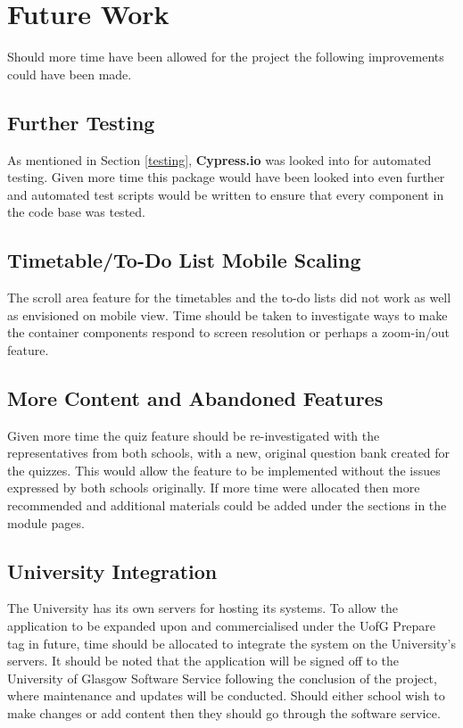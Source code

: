 \documentclass{l4proj}
\begin{document}
\section{Future Work}
Should more time have been allowed for the project the following improvements could have been made.

\subsection{Further Testing}
As mentioned in Section \ref{testing},  \textbf{Cypress.io} was looked into for automated testing. Given more time this package would have been looked into even further and automated test scripts would be written to ensure that every component in the code base was tested.

\subsection{Timetable/To-Do List Mobile Scaling}
The scroll area feature for the timetables and the to-do lists did not work as well as envisioned on mobile view. Time should be taken to investigate ways to make the container components respond to screen resolution or perhaps a zoom-in/out feature.

\subsection{More Content and Abandoned Features}
Given more time the quiz feature should be re-investigated with the representatives from both schools,  with a new, original question bank created for the quizzes. This would allow the feature to be implemented without the issues expressed by both schools originally. If more time were allocated then more recommended and additional materials could be added under the sections in the module pages.

\subsection{University Integration}
The University has its own servers for hosting its systems. To allow the application to be expanded upon and commercialised under the UofG Prepare tag in future,  time should be allocated to integrate the system on the University's servers. It should be noted that the application will be signed off to the University of Glasgow Software Service following the conclusion of the project,  where maintenance and updates will be conducted. Should either school wish to make changes or add content then they should go through the software service.
\end{document}
